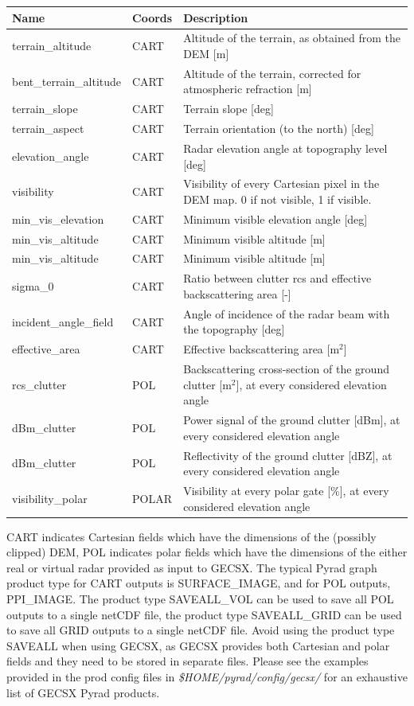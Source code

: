 \documentclass[a4paper,11pt,pdftex,twoside]{scrartcl}
\renewcommand{\bf}{\normalfont \bfseries}
\begin{document}
{{{\begin{longtable}{p{}p{}p{}}
\bf{Name}          & \bf{Coords} & \bf{Description}\\
\hline
terrain\_altitude & CART & Altitude of the terrain, as obtained from the DEM [m]\\
bent\_terrain\_altitude & CART & Altitude of the terrain, corrected for atmospheric refraction [m] \\
terrain\_slope & CART & Terrain slope [deg] \\
terrain\_aspect & CART & Terrain orientation (to the north) [deg]\\
elevation\_angle & CART & Radar elevation angle at topography level [deg] \\
visibility & CART & Visibility of every Cartesian pixel in the DEM map. 0 if not visible, 1 if visible.\\
min\_vis\_elevation & CART & Minimum visible elevation angle [deg] \\
min\_vis\_altitude & CART & Minimum visible altitude [m] \\
min\_vis\_altitude & CART & Minimum visible altitude [m] \\
sigma\_0 & CART & Ratio between clutter rcs and effective backscattering area [-] \\
incident\_angle\_field & CART & Angle of incidence of the radar beam with the topography [deg] \\
effective\_area & CART & Effective backscattering area [m$^2$] \\
rcs\_clutter & POL & Backscattering cross-section of the ground clutter [m$^2$], at every considered elevation angle\\
dBm\_clutter & POL & Power signal of the ground clutter [dBm], at every considered elevation angle\\
dBm\_clutter & POL & Reflectivity of the ground clutter [dBZ], at every considered elevation angle\\
visibility\_polar & POLAR & Visibility at every polar gate [\%], at every considered elevation angle\\
\end{longtable} 

CART indicates Cartesian fields which have the dimensions of the (possibly clipped) DEM, POL indicates polar fields which have the dimensions of the either real or virtual radar provided as input to GECSX. 
The typical Pyrad graph product type for CART outputs is SURFACE\_IMAGE, and for POL outputs, PPI\_IMAGE. The product type SAVEALL\_VOL can be used to save all POL outputs to a single netCDF file, the product type SAVEALL\_GRID can be used to save all GRID outputs to a single netCDF file. Avoid using the product type SAVEALL when using GECSX, as GECSX provides both Cartesian and polar fields and they need to be stored in separate files. Please see the examples provided in the prod config files in \textit{\$HOME/pyrad/config/gecsx/} for an exhaustive list of GECSX Pyrad products.

}}}
\end{document}
